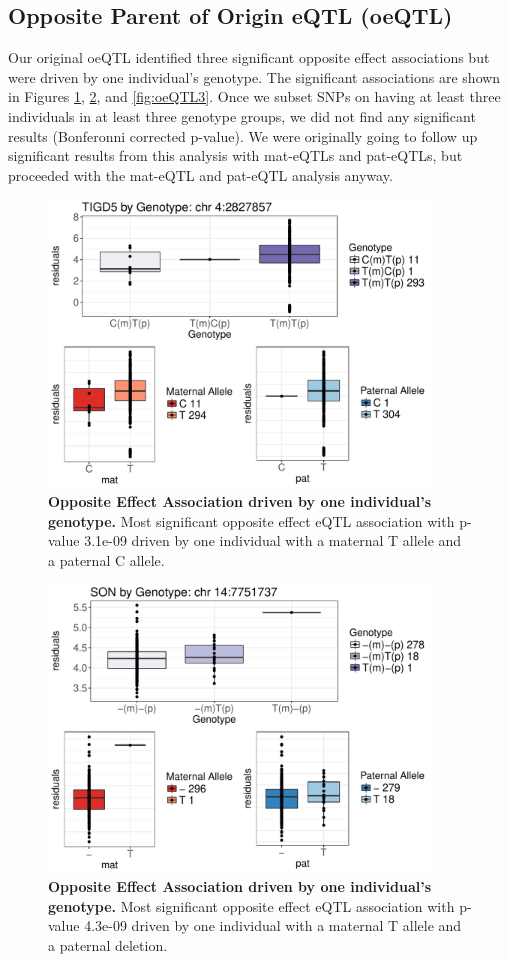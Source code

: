 \subsection{Opposite Parent of Origin eQTL (oeQTL) }\label{Opposite Parent of Origin eQTL (oeQTL)} 
Our original oeQTL identified three significant opposite effect associations but were driven by one individual's genotype. The significant associations are shown in Figures \ref{fig:oeQTL}, \ref{fig:oeQTL2}, and \ref{fig:oeQTL3}. Once we subset SNPs on having at least three individuals in at least three genotype groups, we did not find any significant results (Bonferonni corrected p-value). We were originally going to follow up significant results from this analysis with mat-eQTLs and pat-eQTLs, but proceeded with the mat-eQTL and pat-eQTL analysis anyway.


\begin{figure}[!htb]
\centering \includegraphics[width=4in]{img/ch04/fig-01-oeQTL.pdf}
\caption[Opposite Effect Association driven by one individual's genotype.]{\textbf{Opposite Effect Association driven by one individual's genotype.} Most significant opposite effect eQTL association with p-value 3.1e-09 driven by one individual with a maternal T allele and a paternal C allele.}
\label{fig:oeQTL}
\end{figure}

\begin{figure}[!htb]
\centering \includegraphics[width=4in]{img/ch04/fig-02-oeQTL.pdf}
\caption[Opposite Effect Association driven by one individual's genotype.]{\textbf{Opposite Effect Association driven by one individual's genotype.} Most significant opposite effect eQTL association with p-value 4.3e-09 driven by one individual with a maternal T allele and a paternal deletion.}
\label{fig:oeQTL2}
\end{figure}

